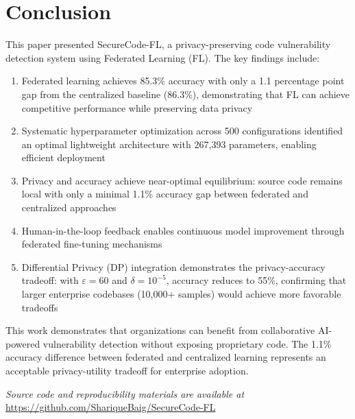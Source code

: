 \documentclass[conference]{IEEEtran}
\begin{document}
\section{Conclusion}

This paper presented SecureCode-FL, a privacy-preserving code vulnerability detection system using Federated Learning (FL). The key findings include:

\begin{enumerate}
    \item Federated learning achieves 85.3\% accuracy with only a 1.1 percentage point gap from the centralized baseline (86.3\%), demonstrating that FL can achieve competitive performance while preserving data privacy
    
    \item Systematic hyperparameter optimization across 500 configurations identified an optimal lightweight architecture with 267,393 parameters, enabling efficient deployment
    
    \item Privacy and accuracy achieve near-optimal equilibrium: source code remains local with only a minimal 1.1\% accuracy gap between federated and centralized approaches
    
    \item Human-in-the-loop feedback enables continuous model improvement through federated fine-tuning mechanisms
    
    \item Differential Privacy (DP) integration demonstrates the privacy-accuracy tradeoff: with $\varepsilon=60$ and $\delta=10^{-5}$, accuracy reduces to 55\%, confirming that larger enterprise codebases (10,000+ samples) would achieve more favorable tradeoffs
\end{enumerate}

This work demonstrates that organizations can benefit from collaborative AI-powered vulnerability detection without exposing proprietary code. The 1.1\% accuracy difference between federated and centralized learning represents an acceptable privacy-utility tradeoff for enterprise adoption.

\textit{Source code and reproducibility materials are available at} \url{https://github.com/ShariqueBaig/SecureCode-FL}

\end{document}
